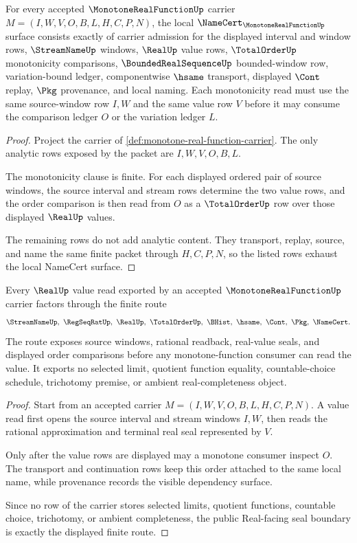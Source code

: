 \begin{theorem}
\label{thm:monotone-real-function-namecert-obligations}
For every accepted $\MonotoneRealFunctionUp$ carrier $M=(I,W,V,O,B,L,H,C,P,N)$, the local $\NameCert_{\MonotoneRealFunctionUp}$ surface consists exactly of carrier admission for the displayed interval and window rows, $\StreamNameUp$ windows, $\RealUp$ value rows, $\TotalOrderUp$ monotonicity comparisons, $\BoundedRealSequenceUp$ bounded-window row, variation-bound ledger, componentwise $\hsame$ transport, displayed $\Cont$ replay, $\Pkg$ provenance, and local naming. Each monotonicity read must use the same source-window row $I,W$ and the same value row $V$ before it may consume the comparison ledger $O$ or the variation ledger $L$.
\end{theorem}
\begin{proof}
Project the carrier of \autoref{def:monotone-real-function-carrier}. The only analytic rows exposed by the packet are $I,W,V,O,B,L$.

The monotonicity clause is finite. For each displayed ordered pair of source windows, the source interval and stream rows determine the two value rows, and the order comparison is then read from $O$ as a $\TotalOrderUp$ row over those displayed $\RealUp$ values.

The remaining rows do not add analytic content. They transport, replay, source, and name the same finite packet through $H,C,P,N$, so the listed rows exhaust the local NameCert surface.
\end{proof}

\begin{theorem}
\label{thm:monotone-real-function-real-seal-boundary}
Every $\RealUp$ value read exported by an accepted $\MonotoneRealFunctionUp$ carrier factors through the finite route
$$
\StreamNameUp,\ \RegSeqRatUp,\ \RealUp,\ \TotalOrderUp,\ \BHist,\ \hsame,\ \Cont,\ \Pkg,\ \NameCert .
$$
The route exposes source windows, rational readback, real-value seals, and displayed order comparisons before any monotone-function consumer can read the value. It exports no selected limit, quotient function equality, countable-choice schedule, trichotomy premise, or ambient real-completeness object.
\end{theorem}
\begin{proof}
Start from an accepted carrier $M=(I,W,V,O,B,L,H,C,P,N)$. A value read first opens the source interval and stream windows $I,W$, then reads the rational approximation and terminal real seal represented by $V$.

Only after the value rows are displayed may a monotone consumer inspect $O$. The transport and continuation rows keep this order attached to the same local name, while provenance records the visible dependency surface.

Since no row of the carrier stores selected limits, quotient functions, countable choice, trichotomy, or ambient completeness, the public Real-facing seal boundary is exactly the displayed finite route.
\end{proof}

